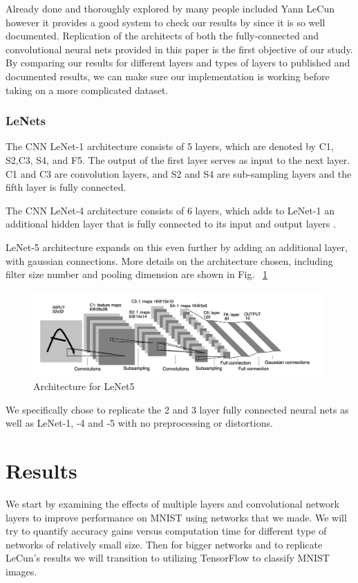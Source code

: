 \documentclass[12pt, twocolumn]{article}
\begin{document}
Already done and thoroughly explored by many people included Yann LeCun \cite{LeCun1998} however it provides a good system to check our results by since it is so well documented.  Replication of the architects of both the fully-connected and convolutional neural nets provided in this paper is the first objective of our study. By comparing our results  for different layers and types of layers to published and documented results, we can make sure our implementation is working before taking on a more complicated dataset. 

\subsubsection{LeNets}
The CNN LeNet-1 architecture consists of 5 layers, which are denoted by C1, S2,C3, S4, and F5.  The output of the first layer serves as
input to the next layer. C1 and C3 are convolution layers, and S2 and S4 are sub-sampling layers and the fifth layer is fully connected. \cite{LeCun89}

The CNN LeNet-4 architecture consists of 6 layers, which adds to LeNet-1 an additional hidden layer that is fully connected to its  input and output layers . \cite{LeCun95}

LeNet-5 architecture expands on this even further by adding an additional layer, with gaussian connections. More details on the architecture chosen, including filter size number and pooling dimension are shown in Fig. ~\ref{fig:LeNet5}

 \begin{figure}
\includegraphics[scale=.6]{LeNet5.png}
\caption{Architecture for LeNet5 \cite{LeCun1998}}
\label{fig:LeNet5}
\end{figure}


 We specifically chose to replicate the 2 and 3 layer fully connected neural nets as well as LeNet-1, -4 and -5 with no preprocessing or distortions. 


\section{Results}
We start by examining the effects of multiple layers and convolutional network layers to improve performance on MNIST using networks that we made. We will try to quantify accuracy gains versus computation time for different type of networks of relatively small size. Then for bigger networks and to replicate LeCun's results we will transition to utilizing TensorFlow to classify MNIST images. 
\end{document}
